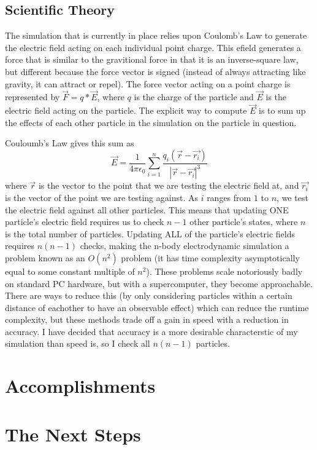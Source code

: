 \documentclass[10pt]{article}
\begin{document}
\subsection{Scientific Theory}
The simulation that is currently in place relies upon Coulomb's Law to generate the electric field acting on each individual point charge. This efield generates a force that is similar to the gravitional force in that it is an inverse-square law, but different because the force vector is signed (instead of always attracting like gravity, it can attract or repel). The force vector acting on a point charge is represented by $\vec{F} = q * \vec{E}$, where $q$ is the charge of the particle and $\vec{E}$ is the electric field acting on the particle. The explicit way to compute $\vec{E}$ is to sum up the effects of each other particle in the simulation on the particle in question.

Couloumb's Law gives this sum as $$\vec{E} = \frac{1}{4\pi\epsilon_0}\sum_{i = 1}^n \frac{q_i (\vec{r} - \vec{r_i})}{|\vec{r} - \vec{r_i}|^3}$$ where $\vec{r}$ is the vector to the point that we are testing the electric field at, and $\vec{r_i}$ is the vector of the point we are testing against. As $i$ ranges from $1$ to $n$, we test the electric field against all other particles. This means that updating ONE particle's electric field requires us to check $n-1$ other particle's states, where $n$ is the total number of particles. Updating ALL of the particle's electric fields requires $n(n-1)$ checks, making the n-body electrodynamic simulation a problem known as an $O(n^2)$ problem (it has time complexity asymptotically equal to some constant multiple of $n^2$). These problems scale notoriously badly on standard PC hardware, but with a supercomputer, they become approachable. There are ways to reduce this (by only considering particles within a certain distance of eachother to have an observable effect) which can reduce the runtime complexity, but these methods trade off a gain in speed with a reduction in accuracy. I have decided that accuracy is a more desirable characterstic of my simulation than speed is, so I check all $n(n-1)$ particles.

\section{Accomplishments}

\section{The Next Steps}
\end{document}
